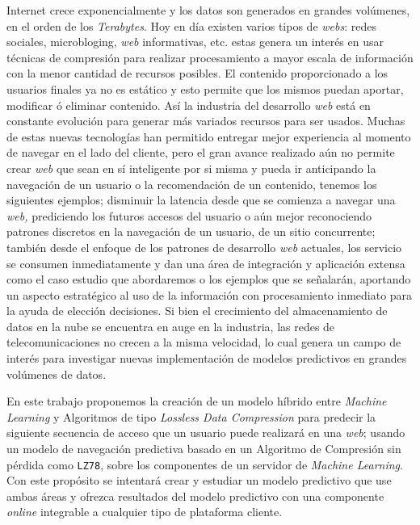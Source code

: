 
Internet crece exponencialmente  y los datos son generados en grandes volúmenes, en el orden de los \emph{Terabytes}. Hoy en día existen varios tipos de \emph{webs}: redes sociales, microbloging, \emph{web} informativas, etc. estas genera un interés en usar técnicas de compresión para realizar procesamiento a mayor escala de información con la menor cantidad de recursos posibles. El contenido proporcionado a los usuarios finales ya no es estático y esto permite que los mismos puedan  aportar, modificar ó eliminar contenido. Así  la industria del desarrollo \emph{web} está en constante evolución para generar más variados recursos para ser usados. Muchas de estas nuevas tecnologías han permitido entregar mejor experiencia al momento de navegar en el lado del cliente, pero el gran avance realizado aún no permite crear \emph{web} que sean en sí inteligente por si misma y pueda ir anticipando la  navegación de un usuario o la recomendación de un contenido, tenemos los siguientes ejemplos; disminuir la latencia desde que se comienza a navegar una \emph{web,} prediciendo los futuros accesos del usuario o aún mejor reconociendo patrones discretos en la navegación de un usuario,  de un sitio concurrente; también desde el enfoque de los patrones de desarrollo \emph{web} actuales, los servicio  se consumen inmediatamente y dan una área de integración y  aplicación extensa como el caso estudio que abordaremos o los ejemplos que se señalarán, aportando un aspecto estratégico al uso de la información con procesamiento inmediato para la ayuda de elección decisiones.
Si bien el crecimiento del almacenamiento de datos en la nube se encuentra en auge en la industria, las redes de telecomunicaciones  no crecen a la misma velocidad, lo cual genera un campo de interés para investigar nuevas implementación de modelos predictivos en grandes volúmenes de datos. 

En este trabajo proponemos  la creación de un modelo híbrido entre \emph{Machine Learning} y Algoritmos de tipo \emph{Lossless Data Compression} para predecir la siguiente secuencia de acceso que un usuario puede realizará en una \emph{web}; usando un modelo de navegación predictiva basado en un Algoritmo de Compresión sin pérdida como \texttt{LZ78}, sobre los componentes de un servidor de \emph{Machine Learning}. Con este propósito se intentará crear y estudiar un modelo predictivo que use ambas áreas y  ofrezca resultados del modelo predictivo con una componente \emph{online} integrable a cualquier tipo de plataforma cliente.